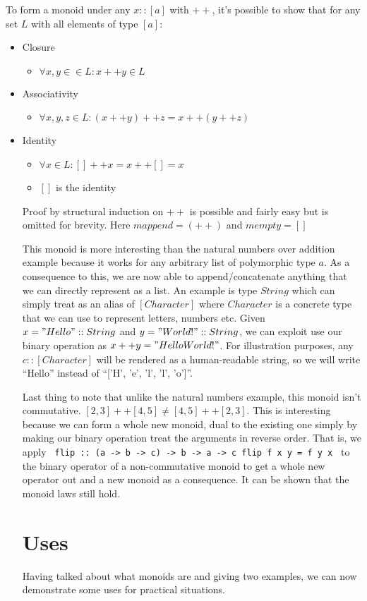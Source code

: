 \documentclass{acm_proc_article-sp}
\begin{document}
{To form a monoid under any $x :: [a]$ with $++$, it's possible to show
that for any set $L$ with all elements of type $[a]$:
\begin{itemize}
\item Closure
  \begin{itemize}
  \item $\forall x,y \in \in L: x ++ y \in L$
  \end{itemize}
\item Associativity
  \begin{itemize}
  \item $\forall x,y,z \in L: (x ++ y) ++ z = x ++ (y ++ z)$
  \end{itemize}
\item Identity
  \begin{itemize}
  \item $\forall x \in L: [] ++ x = x ++ [] = x$
  \item $[]$ is the identity
  \end{itemize}
Proof by structural induction on $++$ is possible and fairly easy but
is omitted for brevity. Here $mappend = (++)$ and $mempty = []$

This monoid is more interesting than the natural numbers over addition
example because it works for any arbitrary list of polymorphic type
$a$. As a consequence to this, we are now able to append/concatenate
anything that we can directly represent as a list. An example is type
$String$ which can simply treat as an alias of $[Character]$ where $Character$
is a concrete type that we can use to represent letters, numbers
etc. Given $x = "Hello " :: String$ and $y = "World!" :: String$, we
can exploit use our binary operation as $x ++ y = "Hello World!"$. For
illustration purposes, any $c :: [Character]$ will be rendered as a
human-readable string, so we will write ``Hello'' instead of ``['H',
'e', 'l', 'l', 'o']''.

Last thing to note that unlike the natural numbers example, this
monoid isn't commutative. $[2, 3] ++ [4, 5] \neq [4, 5] ++ [2,
3]$. This is interesting because we can form a whole new monoid, dual
to the existing one simply by making our binary operation treat the
arguments in reverse order. That is, we apply
\texttt{
flip :: (a -> b -> c) -> b -> a -> c
flip f x y = f y x
}
to the binary operator of a non-commutative monoid to get a whole new
operator out and a new monoid as a consequence. It can be shown that
the monoid laws still hold.

\section{Uses}
Having talked about what monoids are and giving two examples, we can now
demonstrate some uses for practical situations.


\end{itemize}}
\end{document}
